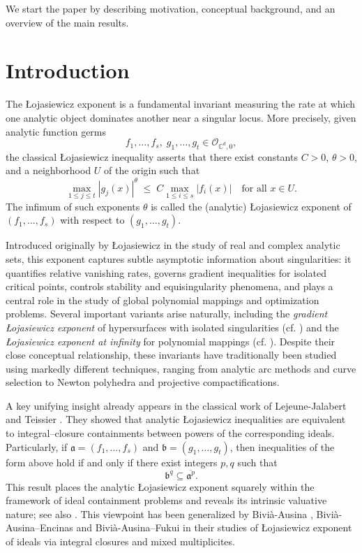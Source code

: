 \documentclass[12pt]{amsart}
\theoremstyle{plain}
\theoremstyle{definition}
\numberwithin{equation}{section}
\begin{document}
We start the paper by describing motivation, conceptual background, and an overview of the main results.  


\section{Introduction} \label{sec:intro}

The \L ojasiewicz exponent is a fundamental invariant measuring the rate at which one
analytic object dominates another near a singular locus.  More precisely, given analytic function germs
\[
f_1,\dots,f_s,\; g_1,\dots,g_t \in \mathcal O_{\mathbb C^d,0},
\]
the classical \L ojasiewicz inequality \cite{Lojasiewicz1959} asserts that there exist constants $C>0$, $\theta>0$,
and a neighborhood $U$ of the origin such that
\[
\max_{1\le j\le t} |g_j(x)|^\theta \;\le\; C \max_{1\le i\le s} |f_i(x)|
\quad \text{for all } x\in U.
\]
The infimum of such exponents $\theta$ is called the (analytic) \L ojasiewicz exponent of
$(f_1,\dots,f_s)$ with respect to $(g_1,\dots,g_t)$.

Introduced originally by \L ojasiewicz in the study of real and complex analytic sets,
this exponent captures subtle asymptotic information about singularities: it quantifies
relative vanishing rates, governs gradient inequalities for isolated critical points,
controls stability and equisingularity phenomena, and plays a central role in the study
of global polynomial mappings and optimization problems.  Several important variants
arise naturally, including the \emph{gradient \L ojasiewicz exponent} of hypersurfaces with isolated singularities (cf. \cite{ Boguslawska, DK2005, Gwo99, Lenarcik}) 
and the \emph{\L ojasiewicz exponent at infinity} for polynomial
mappings (cf. \cite{Dimca,VuiDoat,VuiDuc,VuiSon}).  Despite their close conceptual relationship, these invariants have traditionally
been studied using markedly different techniques, ranging from analytic arc methods and
curve selection to Newton polyhedra and projective compactifications.

A key unifying insight already appears in the classical work of
Lejeune-Jalabert and Teissier \cite{LT}.  They showed that analytic
\L ojasiewicz inequalities are equivalent to integral--closure containments between powers
of the corresponding ideals.  Particularly, if
$\mathfrak a=(f_1,\dots,f_s)$ and $\mathfrak b=(g_1,\dots,g_t)$, then inequalities of the
form above hold if and only if there exist integers $p,q$ such that
\[
\mathfrak b^q \subseteq \overline{\mathfrak a^p}.
\]
This result places the analytic \L ojasiewicz exponent squarely within the framework of
ideal containment problems and reveals its intrinsic valuative nature; see also \cite{BochnakRisler,Teissier2012}.  This viewpoint has been generalized by Bivi\`a-Ausina \cite{Aus09}, Bivi\`a-Ausina--Encinas \cite{BE09, BE13} and Bivi\`a-Ausina--Fukui \cite{BF16} in their studies of \L{}ojasiewicz exponent of ideals via integral closures and mixed multiplicites.
\end{document}
